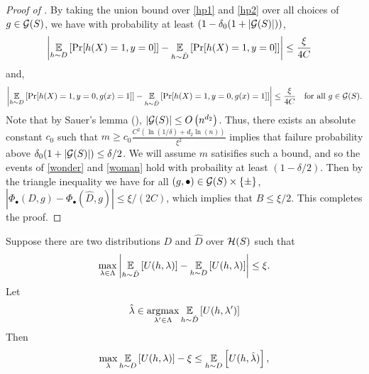 \begin{proof}[Proof of ]
  By taking the union bound over \eqref{hp1} and \eqref{hp2} over all
  choices of $g\in \mathcal{G}(S)$, we have with probability at least
  $(1 - \delta_0(1 + |\mathcal{G}(S)|))$,
  \begin{equation} \left|\operatorname*{\mathbb{E}}_{h\sim D}\left[ \Pr[h(X) = 1, y=0]\right] - \operatorname*{\mathbb{E}}_{h\sim
        \hat D}\left[\Pr[h(X) = 1, y = 0]\right] \right| \leq \frac{\xi}{4C}
    \quad
\label{wonder}\end{equation}
{and,}
  \begin{equation}
    \left| \operatorname*{\mathbb{E}}_{h\sim D}\left[\Pr[h(X) = 1, y= 0, g(x) = 1 ]\right] - \operatorname*{\mathbb{E}}_{h\sim
        \hat D}\left[\Pr[h(X) = 1, y= 0, g(x) = 1 ]\right]\right| \leq
    \frac{\xi}{4C} \quad \mbox{for all } g \in \mathcal{G}(S). \label{woman}
  \end{equation}
  Note that by Sauer's lemma (),
  $|\mathcal{G}(S)|\leq O\left( n^{d_2} \right)$. Thus, there exists an
  absolute constant $c_0$ such that
  $m \geq c_0\frac{C^2\left(\ln(1/\delta) + d_2\ln(n)\right)}{\xi^2}$
  implies that failure probability above
  $\delta_0(1 + |\mathcal{G}(S)|) \leq \delta/2$. We will assume $m$
  satisifies such a bound, and so the events of \eqref{wonder} and
  \eqref{woman} hold with probaility at least $(1 - \delta/2)$.  Then
  by the triangle inequality we have for all
  $(g, \bullet)\in \mathcal{G}(S)\times\{\pm\}$,
  $|\Phi_\bullet(D, g) - \Phi_\bullet(\hat D, g)| \leq \xi/(2C)$,
  which implies that $B \leq \xi/2$. This completes the proof.
\end{proof}

\begin{claim}\label{cor:approx-br}
  Suppose there are two distributions $D$ and $\hat D$ over $\mathcal{H}(S)$
  such that
  \[
    \max_{\lambda\in \Lambda} \left| \operatorname*{\mathbb{E}}_{h\sim \hat D}\left[U(h, \lambda)\right]
      - \operatorname*{\mathbb{E}}_{h\sim D}\left[U(h, \lambda)\right] \right| \leq \xi.
  \]
Let
  $$\hat{\lambda} \in \operatorname*{\mathrm{argmax}}_{\lambda'\in \Lambda} \operatorname*{\mathbb{E}}_{h\sim \hat
    D}\left[U(h, \lambda')\right]$$ 
Then
  \[
    \max_{\lambda} \operatorname*{\mathbb{E}}_{h\sim D}\left[U(h, \lambda)\right] -\xi \leq \operatorname*{\mathbb{E}}_{h\sim
      D}\left[U(h, \hat \lambda)\right],
  \]
\end{claim}


